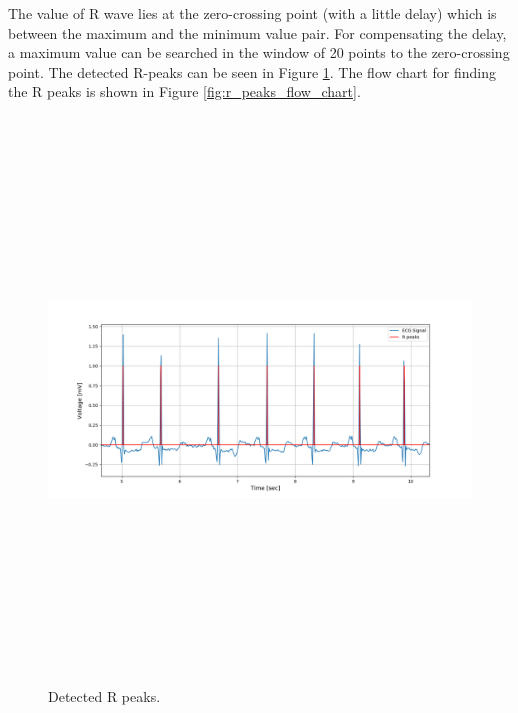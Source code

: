 The value of R wave lies at the zero-crossing point (with a little delay) which is between the maximum and the minimum value pair. For compensating the delay, a maximum value can be searched in the window of 20 points to the zero-crossing point. The detected R-peaks can be seen in Figure \ref{fig:r_peaks}. The flow chart for finding the R peaks is shown in Figure \ref{fig:r_peaks_flow_chart}.

\begin{figure}[htpb]
	\centering
	\includegraphics[width=15cm,height=15cm,keepaspectratio=true]{images/r_peaks}
	\caption{
		Detected R peaks.
	}
	\label{fig:r_peaks}
\end{figure}


